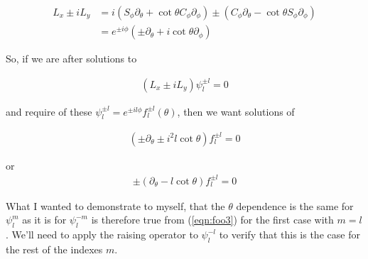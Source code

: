 \begin{align*}
L_x \pm iL_y
&= 
i (S_\phi \partial_\theta + \cot\theta C_\phi \partial_\phi)
\pm (C_\phi \partial_\theta - \cot\theta S_\phi \partial_\phi) \\
&= e^{\pm i\phi} (\pm \partial_\theta + i \cot\theta \partial_\phi )
\end{align*}

So, if we are after solutions to 

\begin{align}\label{eqn:foo1}
(L_x \pm iL_y) \psi_l^{\pm l} = 0
\end{align}

and require of these $\psi_l^{\pm l} = e^{\pm i l \phi} f_l^{\pm l}(\theta)$, then we want solutions of

\begin{align}\label{eqn:foo2}
(\pm \partial_\theta \pm i^2 l \cot\theta ) f_l^{\pm l} = 0
\end{align}

or
\begin{align}\label{eqn:foo3}
\pm (\partial_\theta - l \cot\theta ) f_l^{\pm l} = 0
\end{align}

What I wanted to demonstrate to myself, that the $\theta$ dependence is the same for $\psi_l^m$ as it is for $\psi_l^{-m}$ is therefore true from (\ref{eqn:foo3}) for the first case with $m=l$.  We'll need to apply the raising operator to $\psi_l^{-l}$ to verify that this is the case for the rest of the indexes $m$.

\EndArticle
